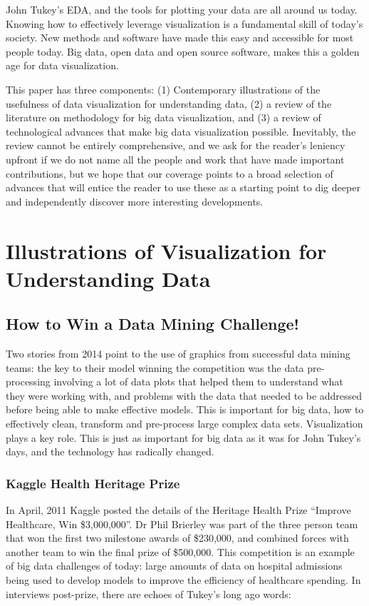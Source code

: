 \documentclass{article}
\begin{document}
John Tukey's EDA, and the tools for plotting your data are all around us today. Knowing how to effectively leverage visualization is a fundamental skill of today's society. New methods and software have made this easy and accessible for most people today. Big data, open data and open source software, makes this a golden age for data visualization. 

This paper has three components: (1) Contemporary illustrations of the usefulness of data visualization for understanding data, (2) a review of the literature on methodology for big data visualization, and (3) a review of technological advances that make big data visualization possible. Inevitably, the review cannot be entirely comprehensive, and we ask for the reader's leniency upfront if we do not name all the people and work that have made important contributions, but we hope that our coverage points to a broad selection of advances that will entice the reader to use these as a starting point to dig deeper and independently discover more interesting developments.  

\section{Illustrations of Visualization for Understanding Data}

\subsection{How to Win a Data Mining Challenge!}

Two stories from 2014 point to the use of graphics from successful data mining teams: the key to their model winning the competition was the data pre-processing involving a lot of data plots that helped them to understand what they were working with, and problems with the data that needed to be addressed before being able to make effective models. This is important for big data, how to effectively clean, transform and pre-process large complex data sets. Visualization plays a key role. This is just as important for big data as it was for John Tukey's days, and the technology has radically changed.

\subsubsection{Kaggle Health Heritage Prize}

In April, 2011 Kaggle posted the details of the Heritage Health Prize ``Improve Healthcare, Win \$3,000,000''.  Dr Phil Brierley was part of the three person team that won the first two milestone awards of \$230,000, and combined forces with another team to win the final prize of \$500,000. This competition is an example of big data challenges of today: large amounts of data on hospital admissions being used to develop models to improve the efficiency of healthcare spending. In interviews post-prize, there are echoes of Tukey's long ago words:
\end{document}
